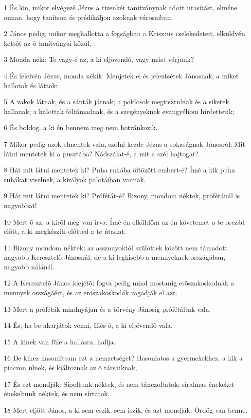 \par 1 És lõn, mikor elvégezé Jézus a tizenkét tanítványnak adott utasítást, elméne onnan, hogy tanítson és prédikáljon azoknak városaiban.
\par 2 János pedig, mikor meghallotta a fogságban a Krisztus cselekedeteit, elküldvén kettõt az õ  tanítványai közül,
\par 3 Monda néki: Te vagy-é az, a ki eljövendõ, vagy mást várjunk?
\par 4 És felelvén Jézus, monda nékik: Menjetek el és jelentsétek Jánosnak, a miket hallotok és láttok:
\par 5 A vakok látnak, és a sánták járnak; a poklosok megtisztulnak és a siketek hallanak; a halottak föltámadnak, és a szegényeknek evangyéliom hirdettetik;
\par 6 És boldog, a ki én bennem meg nem botránkozik.
\par 7 Mikor pedig azok elmentek vala, szólni kezde Jézus a sokaságnak Jánosról: Mit látni mentetek ki a pusztába? Nádszálat-é, a mit a szél hajtogat?
\par 8 Hát mit látni mentetek ki? Puha ruhába öltözött embert-é? Ímé a kik puha ruhákat viselnek, a királyok palotáiban vannak.
\par 9 Hát mit látni mentetek ki? Prófétát-é? Bizony, mondom néktek, prófétánál is nagyobbat!
\par 10 Mert õ az, a kirõl meg van írva: Ímé én elküldöm az én követemet a te orczád elõtt, a ki megkészíti elõtted a te útadat.
\par 11 Bizony mondom néktek: az asszonyoktól szülöttek között nem támadott nagyobb Keresztelõ Jánosnál; de a ki legkisebb a mennyeknek országában, nagyobb nálánál.
\par 12 A Keresztelõ János idejétõl fogva pedig mind mostanig erõszakoskodnak a mennyek országáért, és az erõszakoskodók ragadják el azt.
\par 13 Mert a próféták mindnyájan és a törvény Jánosig prófétáltak vala.
\par 14 És, ha be akarjátok venni, Illés õ, a ki eljövendõ vala.
\par 15 A kinek van füle a hallásra, hallja.
\par 16 De kihez hasonlítsam ezt a nemzetséget? Hasonlatos a gyermekekhez, a kik a piaczon ülnek, és kiáltoznak az õ társaiknak,
\par 17 És ezt mondják: Sípoltunk néktek, és nem tánczoltatok; siralmas énekeket énekeltünk néktek, és nem sírtatok.
\par 18 Mert eljött János, a ki sem eszik, sem iszik, és azt mondják: Ördög van benne.
